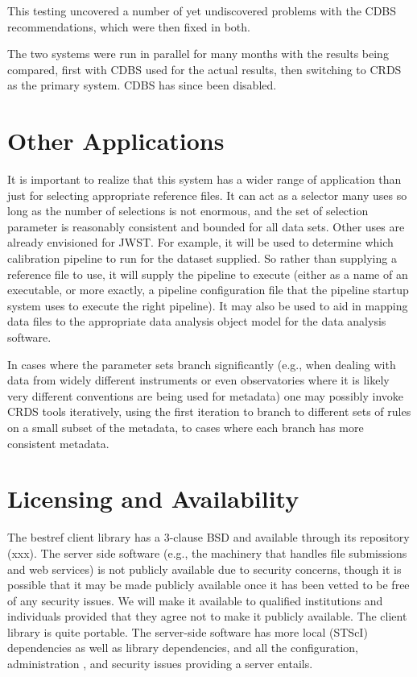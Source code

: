 \documentclass[final,authoryear,5p,times,twocolumn]{elsarticle}
\begin{document}
This testing uncovered a number of yet undiscovered problems with the CDBS
recommendations, which were then fixed in both.

The two systems were run in parallel for many months with the results being
compared, first with CDBS used for the actual results, then switching to CRDS
as the primary system. CDBS has since been disabled.

\section{Other Applications}

It is important to realize that this system has a wider range of application
than just for selecting appropriate reference files. It can act as a selector
many uses so long as the number of selections is not enormous, and the set of
selection parameter is reasonably consistent and bounded for all data
sets. Other uses are already envisioned for JWST. For example, it will be used
to determine which calibration pipeline to run for the dataset supplied. 
So rather than supplying a reference file to use, it will supply the pipeline 
to execute (either as a name of an executable, or more exactly, a pipeline 
configuration file that the pipeline startup system uses to execute the right
pipeline). It may also be
used to aid in mapping data files to the appropriate data analysis object model
for the data analysis software.

In cases where the parameter sets branch significantly (e.g., when dealing with
data from widely different instruments or even observatories where it is likely
very different conventions are being used for metadata) one may possibly invoke
CRDS tools iteratively, using the first iteration to branch to different sets of
rules on a small subset of the metadata, to cases where each branch has more
consistent metadata.

\section{Licensing and Availability}

The bestref client library has a 3-clause BSD and available through its
repository (xxx). The server side software (e.g., the machinery that handles
file submissions and web services) is not publicly available due to security
concerns, though it is possible that it may be made publicly available once it
has been vetted to be free of any security issues. We will make it available to
qualified institutions and individuals provided that they agree not to make it
publicly available. The client library is quite portable. The server-side
software has more local (STScI) dependencies as well as library dependencies,
and all the configuration, administration , and security issues providing a
server entails.
\end{document}
